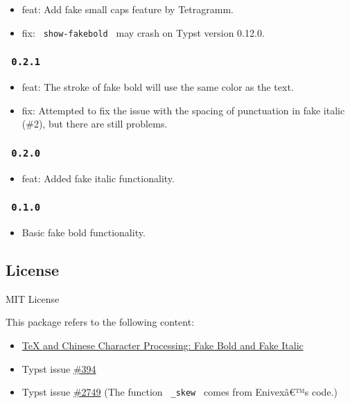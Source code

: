 \begin{itemize}
\tightlist
\item
  feat: Add fake small caps feature by Tetragramm.
\item
  fix: \texttt{\ show-fakebold\ } may crash on Typst version 0.12.0.
\end{itemize}

\subsubsection{\texorpdfstring{\texttt{\ 0.2.1\ }}{ 0.2.1 }}\label{section-1}

\begin{itemize}
\tightlist
\item
  feat: The stroke of fake bold will use the same color as the text.
\item
  fix: Attempted to fix the issue with the spacing of punctuation in
  fake italic (\#2), but there are still problems.
\end{itemize}

\subsubsection{\texorpdfstring{\texttt{\ 0.2.0\ }}{ 0.2.0 }}\label{section-2}

\begin{itemize}
\tightlist
\item
  feat: Added fake italic functionality.
\end{itemize}

\subsubsection{\texorpdfstring{\texttt{\ 0.1.0\ }}{ 0.1.0 }}\label{section-3}

\begin{itemize}
\tightlist
\item
  Basic fake bold functionality.
\end{itemize}

\subsection{License}\label{license}

MIT License

This package refers to the following content:

\begin{itemize}
\tightlist
\item
  \href{https://zhuanlan.zhihu.com/p/19686102}{TeX and Chinese Character
  Processing: Fake Bold and Fake Italic}
\item
  Typst issue \href{https://github.com/typst/typst/issues/394}{\#394}
\item
  Typst issue \href{https://github.com/typst/typst/issues/2749}{\#2749}
  (The function \texttt{\ \_skew\ } comes from Enivexâ€™s code.)
\end{itemize}

